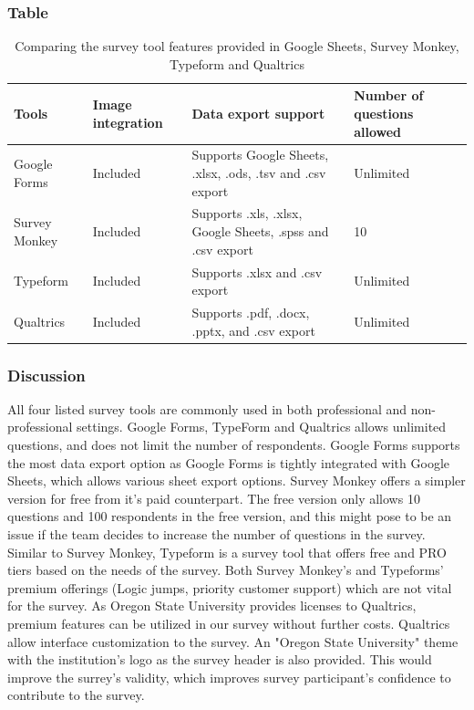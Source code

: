 \documentclass[10pt,journal,compsoc,draftclsnofoot]{IEEEtran}
\begin{document}
\subsubsection{Table}
\begin{center}
\begin{table}[H]
\begin{tabular}{ | m{10em} | m{15em} | m{15em} | m{15em} |  } 
\hline
\textbf{Tools}  & \textbf{Image integration} & \textbf{Data export support} & \textbf{Number of questions allowed} \\ \hline
Google Forms & Included  & Supports Google Sheets, .xlsx, .ods, .tsv and .csv export & Unlimited \\ \hline
Survey Monkey & Included & Supports .xls, .xlsx, Google Sheets, .spss and .csv export & 10 \\ \hline
Typeform & Included & Supports .xlsx and .csv export &  Unlimited \\ \hline 
Qualtrics & Included & Supports .pdf, .docx, .pptx, and .csv export &  Unlimited \\ \hline 
\end{tabular}
\newline
\caption{Comparing the survey tool features provided in Google Sheets, Survey Monkey, Typeform and Qualtrics}
\label{table:surveytool}
\end{table}
\end{center}

\newpage

\subsubsection{Discussion}
All four listed survey tools are commonly used in both professional and non-professional settings.
Google Forms, TypeForm and Qualtrics allows unlimited questions, and does not limit the number of respondents.
Google Forms supports the most data export option as Google Forms is tightly integrated with Google Sheets, which allows various sheet export options.
Survey Monkey offers a simpler version for free from it's paid counterpart.
The free version only allows 10 questions and 100 respondents in the free version, and this might pose to be an issue if the team decides to increase the number of questions in the survey.
Similar to Survey Monkey, Typeform is a survey tool that offers free and PRO tiers based on the needs of the survey.
Both Survey Monkey's and Typeforms' premium offerings (Logic jumps, priority customer support) which are not vital for the survey.
As Oregon State University provides licenses to Qualtrics, premium features can be utilized in our survey without further costs.
Qualtrics allow interface customization to the survey. 
An "Oregon State University" theme with the institution's logo as the survey header is also provided. 
This would improve the surrey's validity, which improves survey participant's confidence to contribute to the survey.
\end{document}
